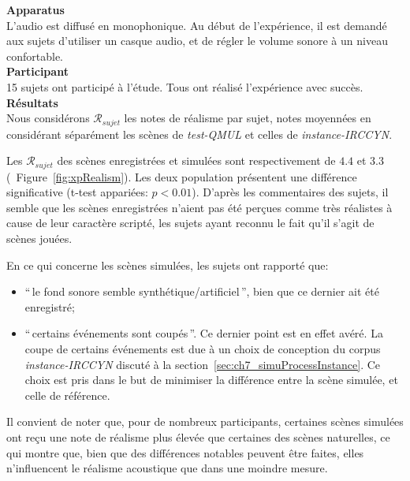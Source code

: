 \textbf{Apparatus} \\

L'audio est diffusé en monophonique. Au début de l'expérience, il est demandé aux sujets d'utiliser un casque audio, et de régler le volume sonore à un niveau confortable.  \\

\textbf{Participant} \\

15 sujets ont participé à l'étude. Tous ont réalisé l'expérience avec succès. \\

\textbf{Résultats} \\

Nous considérons $\mathcal{R}_{sujet}$ les notes de réalisme par sujet, notes moyennées en considérant séparément les scènes de \emph{test-QMUL} et celles de \emph{instance-IRCCYN}.

Les $\mathcal{R}_{sujet}$ des scènes enregistrées et simulées sont respectivement de $4.4$ et $3.3$ (\cf~Figure~\ref{fig:xpRealism}). Les deux population présentent une différence significative (t-test appariées: $p<0.01$). D'après les commentaires des sujets, il semble que les scènes enregistrées n'aient pas été perçues comme très réalistes à cause de leur caractère scripté, les sujets ayant reconnu le fait qu'il s'agit de scènes jouées. 

En ce qui concerne les scènes simulées, les sujets ont rapporté que: 

\begin{itemize}
\item ``\,le fond sonore semble synthétique/artificiel\,'', bien que ce dernier ait été enregistré;
\item ``\,certains événements sont coupés\,''. Ce dernier point est en effet avéré. La coupe de certains événements est due à un choix de conception du corpus \emph{instance-IRCCYN} discuté à la section~\ref{sec:ch7_simuProcessInstance}. Ce choix est pris dans le but de minimiser la différence entre la scène simulée, et celle de référence. 
\end{itemize}

Il convient de noter que, pour de nombreux participants, certaines scènes simulées ont reçu une note de réalisme plus élevée que certaines des scènes naturelles, ce qui montre que, bien que des différences notables peuvent être faites, elles n'influencent le réalisme acoustique que dans une moindre mesure.

